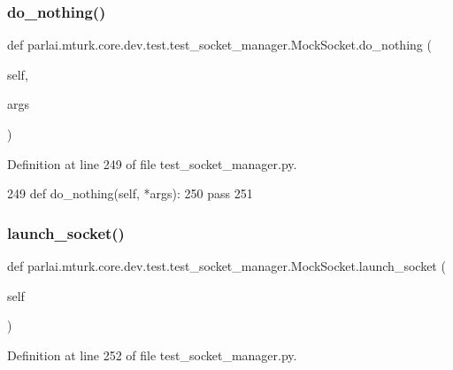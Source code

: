 \subsubsection{\texorpdfstring{do\+\_\+nothing()}{do\_nothing()}}
{\footnotesize\ttfamily def parlai.\+mturk.\+core.\+dev.\+test.\+test\+\_\+socket\+\_\+manager.\+Mock\+Socket.\+do\+\_\+nothing (\begin{DoxyParamCaption}\item[{}]{self,  }\item[{}]{args }\end{DoxyParamCaption})}



Definition at line 249 of file test\+\_\+socket\+\_\+manager.\+py.


\begin{DoxyCode}
249     \textcolor{keyword}{def }do\_nothing(self, *args):
250         \textcolor{keywordflow}{pass}
251 
\end{DoxyCode}
\mbox{\label{classparlai_1_1mturk_1_1core_1_1dev_1_1test_1_1test__socket__manager_1_1MockSocket_abb76518775b6bd8be86b36045c7a29cd}} 
\subsubsection{\texorpdfstring{launch\+\_\+socket()}{launch\_socket()}}
{\footnotesize\ttfamily def parlai.\+mturk.\+core.\+dev.\+test.\+test\+\_\+socket\+\_\+manager.\+Mock\+Socket.\+launch\+\_\+socket (\begin{DoxyParamCaption}\item[{}]{self }\end{DoxyParamCaption})}



Definition at line 252 of file test\+\_\+socket\+\_\+manager.\+py.


